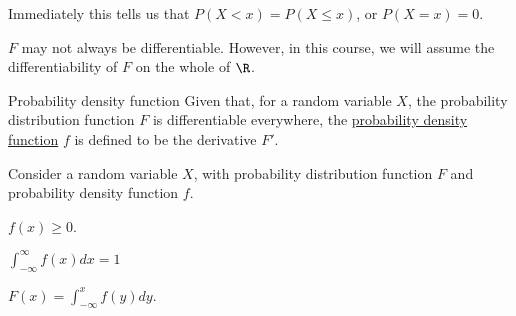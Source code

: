 \documentclass[../Main.tex]{subfiles}
\begin{document}
Immediately this tells us that $P(X < x) = P(X \leq x)$, or $P(X = x) = 0$.\par
$F$ may not always be differentiable. However, in this course, we will assume the differentiability of $F$ on the whole of $\R$.
\begin{definition}{Probability density function}
    Given that, for a random variable $X$, the probability distribution function $F$ is differentiable everywhere, the \underline{probability density function} $f$ is defined to be the derivative $F'$.
\end{definition}
\begin{propositions}{
        Consider a random variable $X$, with probability distribution function $F$ and probability density function $f$.
        \label{propsPdensFuncProps}
    }
    \item $f(x) \geq 0$. \label{propPdensFuncNonNegative}
    \item $\int_{-\infty}^\infty f(x) dx = 1$ \label{propPdensFuncIntegralOne}
    \item $F(x) = \int_{-\infty}^x f(y) dy$. \label{propPdensFuncIntegratePDF}
\end{propositions}
\end{document}
